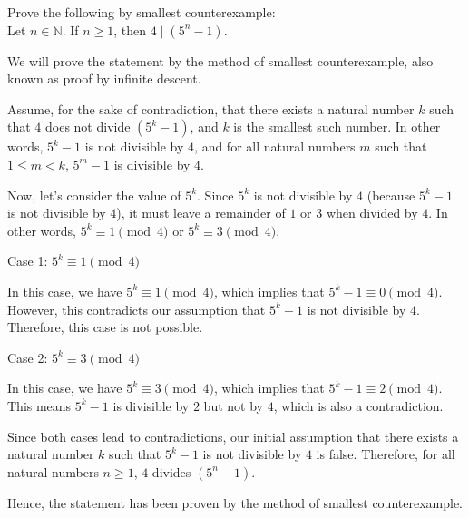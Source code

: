 \documentclass{article}
\theoremstyle{definition}
\begin{document}
\begin{question}
    Prove the following by smallest counterexample:\\
    Let $n\in \mathbb{N}$. If $n\geq 1$, then $4 \mid (5^n-1)$.
\end{question}
\begin{solution}
We will prove the statement by the method of smallest counterexample, also known as proof by infinite descent.

Assume, for the sake of contradiction, that there exists a natural number $k$ such that $4$ does not divide $(5^k - 1)$, and $k$ is the smallest such number. In other words, $5^k - 1$ is not divisible by $4$, and for all natural numbers $m$ such that $1 \leq m < k$, $5^m - 1$ is divisible by $4$.

Now, let's consider the value of $5^k$. Since $5^k$ is not divisible by $4$ (because $5^k - 1$ is not divisible by $4$), it must leave a remainder of $1$ or $3$ when divided by $4$. In other words, $5^k \equiv 1 \pmod{4}$ or $5^k \equiv 3 \pmod{4}$.

Case 1: $5^k \equiv 1 \pmod{4}$

In this case, we have $5^k \equiv 1 \pmod{4}$, which implies that $5^k - 1 \equiv 0 \pmod{4}$. However, this contradicts our assumption that $5^k - 1$ is not divisible by $4$. Therefore, this case is not possible.

Case 2: $5^k \equiv 3 \pmod{4}$

In this case, we have $5^k \equiv 3 \pmod{4}$, which implies that $5^k - 1 \equiv 2 \pmod{4}$. This means $5^k - 1$ is divisible by $2$ but not by $4$, which is also a contradiction.

Since both cases lead to contradictions, our initial assumption that there exists a natural number $k$ such that $5^k - 1$ is not divisible by $4$ is false. Therefore, for all natural numbers $n \geq 1$, $4$ divides $(5^n - 1)$.

Hence, the statement has been proven by the method of smallest counterexample.
\end{solution}
\end{document}
